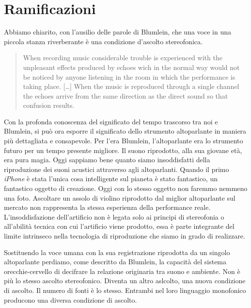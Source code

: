 \section{Ramificazioni}

Abbiamo chiarito, con l'ausilio delle parole di Blumlein, che una voce in
una piccola stanza riverberante è una condizione d'ascolto stereofonica.

\begin{quote}
When recording music considerable trouble is experienced with the unpleasant
effects produced by echoes wich in the normal way would not be noticed by anyone
listening in the room in which the performance is taking place. [\ldots]
When the music is reproduced through a single channel the echoes arrive from
the same direction as the direct sound so that confusion results.
\end{quote}

Con la profonda conoscenza del significato del tempo trascorso tra noi e Blumlein,
si può ora esporre il significato dello strumento altoparlante in maniera più
dettagliata e consapevole. Per l'era Blumlein, l'altoparlante era lo strumento
futuro per un tempo presente migliore. Il suono riprodotto, alla sua giovane età,
era pura magia. Oggi sappiamo bene quanto siamo insoddisfatti della riproduzione
dei suoni acustici attraverso agli altoparlanti. Quando il primo \emph{iPhone} è
stata l'unica cosa intelligente sul pianeta è stato fantastico, un fantastico
oggetto di creazione. Oggi con lo stesso oggetto non faremmo nemmeno una foto.
Ascoltare un assolo di violino riprodotto dal miglior altoparlante sul mercato
non rappresenta la stessa esperienza della performance reale. L'insoddisfazione
dell'artificio non è legata solo ai principi di stereofonia o all'abilità tecnica
con cui l'artificio viene prodotto, essa è parte integrante del limite intrinseco
nella tecnologia di riproduzione che siamo in grado di realizzare.

Sostituendo la voce umana con la sua registrazione riprodotta da un singolo
altoparlante perdiamo, come descritto da Blumlein, la capacità del sistema
orecchie-cervello di decifrare la relazione originaria tra suono e ambiente.
Non è più lo stesso ascolto stereofonico. Diventa un altro aslcolto, una nuova
condizione di ascolto. Il numero di fonti è lo stesso. Entrambi nel loro
linguaggio monofonico producono una diversa condizione di ascolto.

